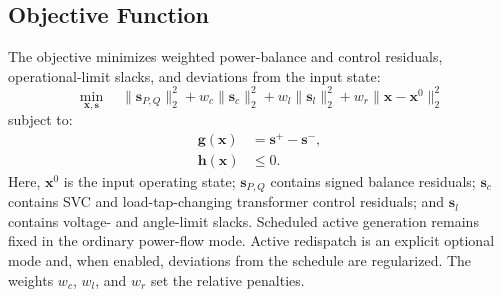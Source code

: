 \documentclass[letterpaper,journal]{IEEEtran}
\begin{document}
\subsection{Objective Function}
The objective minimizes weighted power-balance and control residuals, operational-limit slacks, and deviations from the input state:
\begin{equation}
	\min_{\mathbf{x},\mathbf{s}}\quad
\|\mathbf{s}_{P,Q}\|_2^2+w_c\|\mathbf{s}_{c}\|_2^2
+w_l\|\mathbf{s}_{l}\|_2^2+w_r\|\mathbf{x}-\mathbf{x}^{0}\|_2^2
	\label{eq:obj_function}
\end{equation}
subject to:
\begin{align}
	\mathbf{g}(\mathbf{x}) & = \mathbf{s}^{+}-\mathbf{s}^{-}, \label{eq:equality_cons}      \\
	\mathbf{h}(\mathbf{x}) & \leq 0. \label{eq:inequality_cons}
\end{align}
Here, $\mathbf{x}^{0}$ is the input operating state; $\mathbf{s}_{P,Q}$ contains signed balance residuals; $\mathbf{s}_{c}$ contains SVC
and load-tap-changing transformer control residuals; and $\mathbf{s}_{l}$ contains voltage- and angle-limit slacks. Scheduled active
generation remains fixed in the ordinary power-flow mode. Active redispatch is an explicit optional mode and, when enabled, deviations from
the schedule are regularized. The weights $w_c$, $w_l$, and $w_r$ set the relative penalties.
\end{document}

